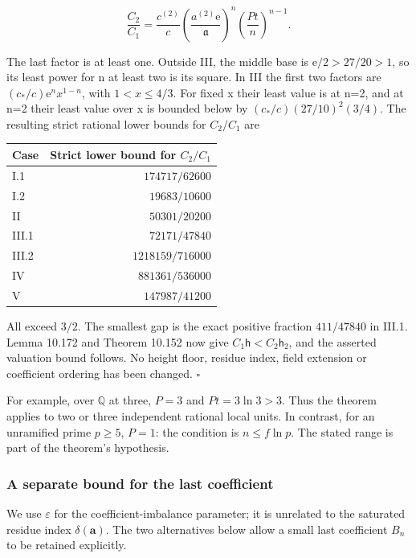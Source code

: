 \documentclass[
  11pt,
  a4paper,
]{article}
\newcounter{none} %
\begin{document}
\[
\frac{C_2}{C_1}
=\frac{c^{(2)}}c
 \left(\frac{a^{(2)}\mathrm e}{\mathfrak a}\right)^n
 \left(\frac{Pt}{n}\right)^{n-1}.
\tag{10.648}
\]

The last factor is at least one. Outside III, the middle base is
\(\mathrm e/2>27/20>1\), so its least power for n at least two is its
square. In III the first two factors are \((c_*/c)\mathrm e^n x^{1-n}\),
with \(1<x\le4/3\). For fixed x their least value is at n=2, and at n=2
their least value over x is bounded below by \((c_*/c)(27/10)^2(3/4)\).
The resulting strict rational lower bounds for \(C_2/C_1\) are

{\def\LTcaptype{none} %
\begin{longtable}[]{@{}lr@{}}
\toprule\noalign{}
Case & Strict lower bound for \(C_2/C_1\) \\
\midrule\noalign{}
\endhead
\bottomrule\noalign{}
\endlastfoot
I.1 & \(174717/62600\) \\
I.2 & \(19683/10600\) \\
II & \(50301/20200\) \\
III.1 & \(72171/47840\) \\
III.2 & \(1218159/716000\) \\
IV & \(881361/536000\) \\
V & \(147987/41200\) \\
\end{longtable}
}

All exceed \(3/2\). The smallest gap is the exact positive fraction
\(411/47840\) in III.1. Lemma 10.172 and Theorem 10.152 now give
\(C_1\mathsf h<C_2\mathsf h_2\), and the asserted valuation bound
follows. No height floor, residue index, field extension or coefficient
ordering has been changed. \(\square\)

For example, over \(\mathbb Q\) at three, \(P=3\) and \(Pt=3\ln3>3\).
Thus the theorem applies to two or three independent rational local
units. In contrast, for an unramified prime \(p\ge5\), \(P=1\): the
condition is \(n\le f\ln p\). The stated range is part of the theorem's
hypothesis.

\subsubsection{A separate bound for the last
coefficient}\label{a-separate-bound-for-the-last-coefficient}

We use \(\varepsilon\) for the coefficient-imbalance parameter; it is
unrelated to the saturated residue index \(\delta(\boldsymbol a)\). The
two alternatives below allow a small last coefficient \(B_n\) to be
retained explicitly.
\end{document}
